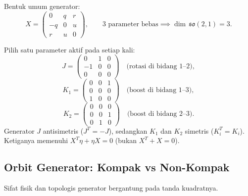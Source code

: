 Bentuk umum generator:
\begin{equation}\label{a2-eq:general-X}
    X = \begin{pmatrix}0 & q & r \\ -q & 0 & u \\ r & u & 0\end{pmatrix},
    \qquad \text{3 parameter bebas} \implies \dim\,\mathfrak{so}(2,1) = 3.
\end{equation}

\vspace{0.5em}
Pilih satu parameter aktif pada setiap kali:
\begin{equation}\label{a2-eq:J-def}
    J = \begin{pmatrix}0&1&0\\-1&0&0\\0&0&0\end{pmatrix} \quad\text{(rotasi di bidang 1--2)},
\end{equation}
\begin{equation}\label{a2-eq:K1-def}
    K_1 = \begin{pmatrix}0&0&1\\0&0&0\\1&0&0\end{pmatrix} \quad\text{(boost di bidang 1--3)},
\end{equation}
\begin{equation}\label{a2-eq:K2-def}
    K_2 = \begin{pmatrix}0&0&0\\0&0&1\\0&1&0\end{pmatrix} \quad\text{(boost di bidang 2--3)}.
\end{equation}
Generator $J$ antisimetris ($J^T = -J$), sedangkan $K_1$ dan $K_2$ simetris ($K_i^T = K_i$). Ketiganya memenuhi $X^T\eta + \eta X = 0$ (bukan $X^T + X = 0$).

\subsection{Orbit Generator: Kompak vs Non-Kompak}

Sifat fisik dan topologis generator bergantung pada tanda kuadratnya.

